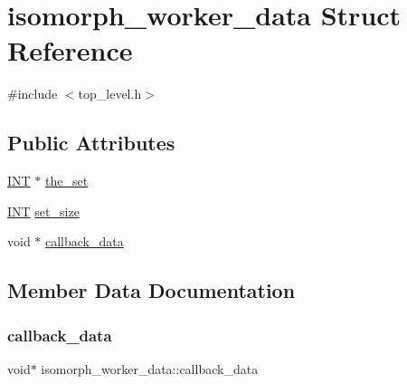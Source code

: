 \hypertarget{structisomorph__worker__data}{}\section{isomorph\+\_\+worker\+\_\+data Struct Reference}
\label{structisomorph__worker__data}


{\ttfamily \#include $<$top\+\_\+level.\+h$>$}

\subsection*{Public Attributes}
\begin{DoxyCompactItemize}
\item 
\mbox{\hyperlink{galois_8h_a09fddde158a3a20bd2dcadb609de11dc}{I\+NT}} $\ast$ \mbox{\hyperlink{structisomorph__worker__data_aeebcf1f17e7ba2804da0d1345af1946a}{the\+\_\+set}}
\item 
\mbox{\hyperlink{galois_8h_a09fddde158a3a20bd2dcadb609de11dc}{I\+NT}} \mbox{\hyperlink{structisomorph__worker__data_ab31f4b653e2810baf359a83722db49b0}{set\+\_\+size}}
\item 
void $\ast$ \mbox{\hyperlink{structisomorph__worker__data_a0a714b0aa941b7174ffb7639a057328f}{callback\+\_\+data}}
\end{DoxyCompactItemize}


\subsection{Member Data Documentation}
\mbox{\label{structisomorph__worker__data_a0a714b0aa941b7174ffb7639a057328f}} 
\subsubsection{\texorpdfstring{callback\+\_\+data}{callback\_data}}
{\footnotesize\ttfamily void$\ast$ isomorph\+\_\+worker\+\_\+data\+::callback\+\_\+data}

\mbox{\label{structisomorph__worker__data_ab31f4b653e2810baf359a83722db49b0}} 
